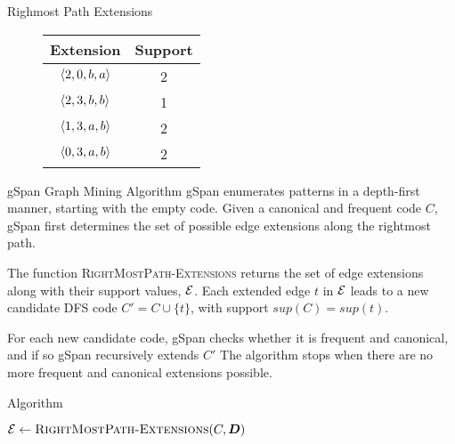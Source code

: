 \begin{frame}[fragile]{Righmost Path Extensions}
\begin{figure}
{{\begin{minipage}{3in}
{    \begin{tabular}{c|c}
      \hline
      Extension & Support\\
      \hline\hline
      $\langle 2,0,b,a \rangle$ & 2\\
      $\langle 2,3,b,b \rangle$ & 1\\
      $\langle 1,3,a,b \rangle$ & 2\\
      $\langle 0,3,a,b \rangle$ & 2\\
    \end{tabular}
    }
  \end{minipage}
  }
  }
\end{figure}
\end{frame}


\ifdefined\wox \begin{frame} \titlepage \end{frame} \fi

\begin{frame}{gSpan Graph Mining Algorithm}
gSpan enumerates patterns in a depth-f\/{i}rst manner, starting with the
empty code.  Given a canonical and frequent code $C$, gSpan f\/{i}rst
determines the set of possible edge extensions  along the rightmost
path.

\medskip
The function \textsc{RightMostPath-Extensions}
returns the set of edge extensions along with their support values, ${\mathcal E}$.
Each extended edge $t$ in ${\mathcal E}$ leads to a new candidate
DFS code $C' = C \cup
\{t\}$, with support $sup(C) = sup(t)$.


\medskip
For each new candidate code,
gSpan checks whether it is frequent and
canonical, and if so gSpan recursively extends $C'$
The
algorithm stops when there are no more frequent and canonical extensions
possible.
\end{frame}

\begin{frame}[fragile]{Algorithm \alggspan}
\begin{tightalgo}[H]{\textwidth-18pt}
  \gSpan{}
  ${\mathcal E} \gets \textsc{RightMostPath-Extensions}(C, {\boldsymbol D})$ 
\end{tightalgo}
\end{frame}



